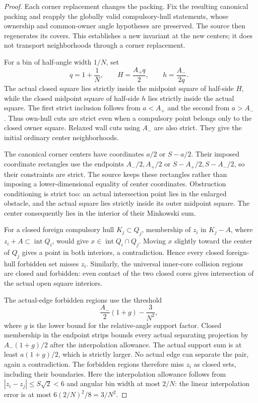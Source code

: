\documentclass[11pt]{article}
\begin{document}
\begin{proof}
Each corner replacement changes the packing. Fix the resulting canonical
packing and reapply the globally valid compulsory-hull statements, whose
ownership and common-owner angle hypotheses are preserved. The source
then regenerates its covers. This establishes a new invariant at the new
centers; it does not transport neighborhoods through a corner replacement.

For a bin of half-angle width $1/N$, set
\[
 q=1+\frac1N,\qquad H=\frac{A_+q}{2},\qquad
 h=\frac{A_-}{2q}.
\]
The actual closed square lies strictly inside the midpoint square of
half-side $H$, while the closed midpoint square of half-side $h$ lies
strictly inside the actual square. The first strict inclusion follows
from $a<A_+$ and the second from $a>A_-$. Thus own-hull cuts are strict
even when a compulsory point belongs only to the closed owner square.
Relaxed wall cuts using $A_-$ are also strict. They give the initial
ordinary center neighborhoods.

The canonical corner centers have coordinates $a/2$ or $S-a/2$.
Their imposed coordinate rectangles use the endpoints $A_-/2,A_+/2$
or $S-A_+/2,S-A_-/2$, so their constraints are strict. The source keeps
these rectangles rather than imposing a lower-dimensional equality of
center coordinates. Obstruction conditioning is strict too: an actual
intersection point lies in the enlarged obstacle, and the actual square
lies strictly inside its outer midpoint square. The center consequently
lies in the interior of their Minkowski sum.

For a closed foreign compulsory hull $K_j\subset Q_j$, membership of
$z_i$ in $K_j-A$, where $z_i+A\subset\operatorname{int}Q_i$, would give
$x\in\operatorname{int}Q_i\cap Q_j$. Moving $x$ slightly toward the
center of $Q_j$ gives a point in both interiors, a contradiction.
Hence every closed foreign-hull forbidden set misses $z_i$.
Similarly, the universal inner-core collision regions are closed and
forbidden: even contact of the two closed cores gives intersection of
the actual open square interiors.

The actual-edge forbidden regions use the threshold
\[
 \frac{A_-}{2}(1+g)-\frac3{N^2},
\]
where $g$ is the lower bound for the relative-angle support factor.
Closed membership in the endpoint strips bounds every actual separating
projection by $A_-(1+g)/2$ after the interpolation allowance. The actual
support sum is at least $a(1+g)/2$, which is strictly larger. No actual
edge can separate the pair, again a contradiction. The forbidden regions
therefore miss $z_i$ as closed sets, including their boundaries.
Here the interpolation allowance follows from
$|z_i-z_j|\le S\sqrt2<6$ and angular bin width at most $2/N$:
the linear interpolation error is at most $6(2/N)^2/8=3/N^2$.


\end{proof}
\end{document}
